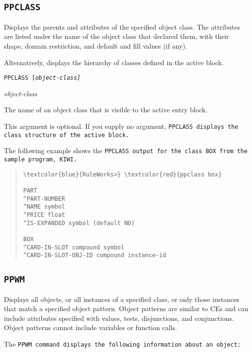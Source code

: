 {{\subsection{\tt{PPCLASS}}

Displays the parents and attributes of the specified object class. The
attributes are listed under the name of the object class that declared
them, with their shape, domain restriction, and default and fill
values (if any).

Alternatively, displays the hierarchy of classes defined in the active
block.

\Format

\tt{PPCLASS} [\it{object-class}]

\Argument

\it{object-class}

The name of an object class that is visible to the active
entry block.

This argument is optional. If you supply no argument, \tt{PPCLASS}
displays the class structure of the active block.

\Example

The following example shows the \tt{PPCLASS} output for the class
\tt{BOX} from the sample program, \tt{KIWI}.

\begin{quote}
\begin{Verbatim}[commandchars=\\\{\}]
\textcolor{blue}{RuleWorks>} \textcolor{red}{ppclass box}

PART
^PART-NUMBER
^NAME symbol
^PRICE float
^IS-EXPANDED symbol (default NO)

BOX
^CARD-IN-SLOT compound symbol
^CARD-IN-SLOT-OBJ-ID compound instance-id
\end{Verbatim}
\end{quote}

\subsection{\tt{PPWM}}

Displays all objects, or all instances of a specified class, or only
those instances that match a specified object pattern. Object patterns
are similar to CEs and can include attributes specified with values,
tests, disjunctions, and conjunctions. Object patterns cannot include
variables or function calls.

The \tt{PPWM} command displays the following information about an
object:

}}
